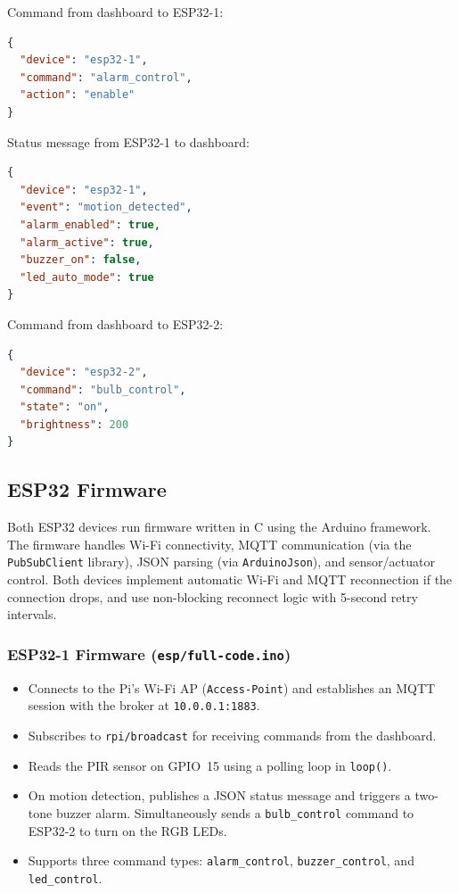\documentclass[12pt,a4paper]{article}
\begin{document}
Command from dashboard to ESP32-1:
\begin{lstlisting}[language=json]
{
  "device": "esp32-1",
  "command": "alarm_control",
  "action": "enable"
}
\end{lstlisting}

Status message from ESP32-1 to dashboard:
\begin{lstlisting}[language=json]
{
  "device": "esp32-1",
  "event": "motion_detected",
  "alarm_enabled": true,
  "alarm_active": true,
  "buzzer_on": false,
  "led_auto_mode": true
}
\end{lstlisting}

Command from dashboard to ESP32-2:
\begin{lstlisting}[language=json]
{
  "device": "esp32-2",
  "command": "bulb_control",
  "state": "on",
  "brightness": 200
}
\end{lstlisting}

\subsection{ESP32 Firmware}
\label{sec:firmware}

Both ESP32 devices run firmware written in C using the Arduino framework. The firmware handles Wi-Fi connectivity, MQTT communication (via the \texttt{PubSubClient} library), JSON parsing (via \texttt{ArduinoJson}), and sensor/actuator control. Both devices implement automatic Wi-Fi and MQTT reconnection if the connection drops, and use non-blocking reconnect logic with 5-second retry intervals.

\subsubsection*{ESP32-1 Firmware (\texttt{esp/full-code.ino})}
\begin{itemize}
    \item Connects to the Pi's Wi-Fi AP (\texttt{Access-Point}) and establishes an MQTT session with the broker at \texttt{10.0.0.1:1883}.
    \item Subscribes to \texttt{rpi/broadcast} for receiving commands from the dashboard.
    \item Reads the PIR sensor on GPIO~15 using a polling loop in \texttt{loop()}.
    \item On motion detection, publishes a JSON status message and triggers a two-tone buzzer alarm. Simultaneously sends a \texttt{bulb\_control} command to ESP32-2 to turn on the RGB LEDs.
    \item Supports three command types: \texttt{alarm\_control}, \texttt{buzzer\_control}, and \texttt{led\_control}.
\end{itemize}
\end{document}
